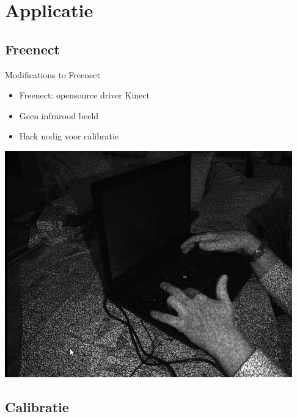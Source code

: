 \documentclass{beamer}
\begin{document}
\section{Applicatie}
\subsection{Freenect}
\begin{frame}{Modifications to Freenect}
\begin{itemize}
\item Freenect: opensource driver Kinect
\item Geen infrarood beeld
\item Hack nodig voor calibratie
\end{itemize}
\pause
\includegraphics[scale=0.4]{kinect-ir-image.jpg}

\end{frame}
\subsection{Calibratie}
\end{document}
